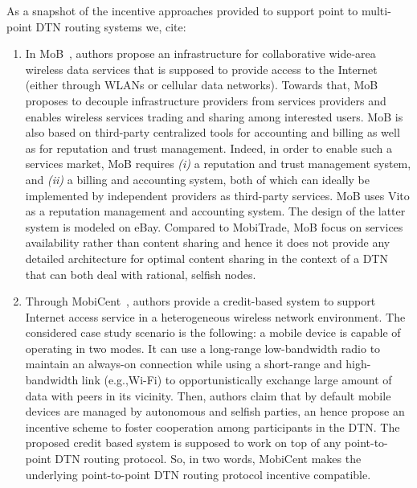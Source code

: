 As a snapshot of the incentive approaches provided to support point to multi-point DTN routing systems we, cite:
\begin{enumerate}

\item In MoB~\cite{MoB}, authors propose an infrastructure for collaborative wide-area wireless data services that is supposed to provide access to the Internet (either through WLANs or cellular data networks). Towards that,  MoB proposes to decouple infrastructure providers from services providers and enables wireless services trading and sharing among interested users. MoB is also based on third-party centralized tools for accounting and billing as well as for reputation and trust management. Indeed, in order to enable such a services market, MoB requires \emph{(i)} a reputation and trust management system, and \emph{(ii)} a billing and accounting system, both of which can ideally be implemented by independent providers as third-party services. MoB uses Vito as a reputation management and accounting system. The design of the latter system is modeled on eBay. Compared to MobiTrade, MoB focus on services availability rather than content sharing and hence it does not provide any detailed architecture for optimal content sharing in the context of a DTN that can both deal with rational, selfish nodes.

\item Through MobiCent~\cite{MobiCent}, authors provide a credit-based system to support Internet access service in a heterogeneous wireless network environment. The considered case study scenario is the following: a mobile device is capable of operating in two modes. It can use a long-range low-bandwidth radio to maintain an always-on connection while using a short-range and high-bandwidth link (e.g.,Wi-Fi) to opportunistically exchange large amount of data with peers in its vicinity. Then, authors
claim that by default mobile devices are managed by autonomous and selfish parties, an hence propose an incentive scheme to foster cooperation among participants in the DTN. The proposed credit based system is supposed to work on top of any point-to-point DTN routing protocol. So, in two words, MobiCent makes the underlying point-to-point DTN routing protocol incentive compatible. 


\end{enumerate}
